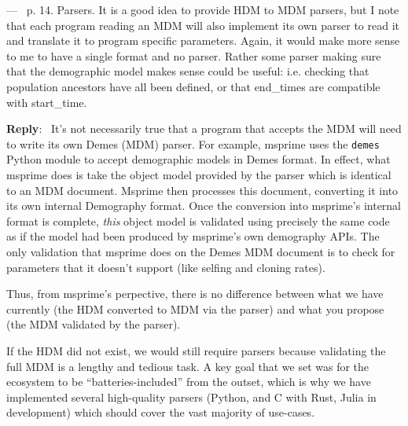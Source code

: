 \documentclass[11pt]{article}
\newcounter{reviewer}
\newcounter{point}[reviewer]
\renewcommand{\thepoint}{\thereviewer.\arabic{point}}
\newenvironment{point}
   {\refstepcounter{point} \bigskip \noindent {\textbf{Reviewer~Point~\thepoint} } ---\ }
   {\par }
\newenvironment{reply}
   {\medskip \noindent \begin{sf}\textbf{Reply}:\  }
   {\medskip \end{sf}}
\begin{document}
\begin{point}
p. 14. Parsers. It is a good idea to provide HDM to MDM parsers, but I note
  that each program reading an MDM will also implement its own parser to read
it and translate it to program specific parameters. Again, it would make more
sense to me to have a single format and no parser. Rather some parser making
sure that the demographic model makes sense could be useful: i.e. checking that
population ancestors have all been defined, or that end\_times are compatible
with start\_time.
\end{point}
\begin{reply}
It's not necessarily true that a program that accepts the MDM will need to
write its own Demes (MDM) parser. For example, msprime uses the \texttt{demes}
Python module to accept demographic models in Demes format. In effect,
what msprime does is take the object model provided by the parser
which is identical to an MDM document. Msprime then processes this document,
converting it into its own internal Demography format. Once the conversion
into msprime's internal format is complete, \emph{this} object
model is validated using precisely the same code as if the model
had been produced by msprime's own demography APIs.
The only validation that msprime does on the Demes MDM document
is to check for parameters that it doesn't support (like selfing and cloning
rates).

Thus, from msprime's perpective, there is no difference between what we
have currently (the HDM converted to MDM via the parser) and what
you propose (the MDM validated by the parser).

If the HDM did not exist, we would still require parsers because validating
the full MDM is a lengthy and tedious task.
A key goal that we set was for the ecosystem to be ``batteries-included''
from the outset, which is why we have implemented several high-quality
parsers (Python, and C with Rust, Julia in development) which should
cover the vast majority of use-cases.
\end{reply}
\end{document}
